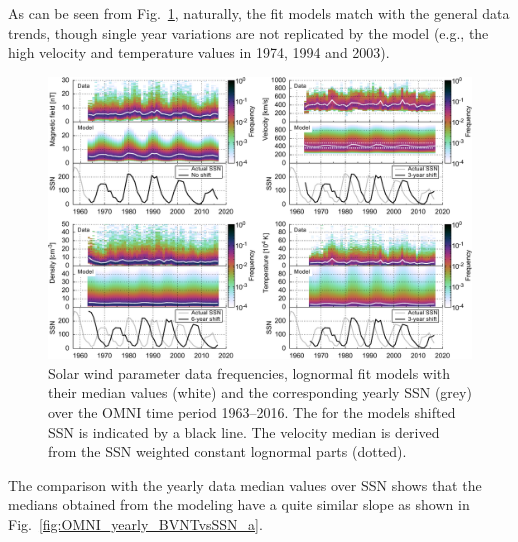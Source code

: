 As can be seen from Fig.~\ref{fig:OMNI_yearly_BVdblNTSSN_fit_e_plot}, naturally, the fit models match with the general data trends, though single year variations are not replicated by the model (e.g., the high velocity and temperature values in 1974, 1994 and 2003).
\begin{figure}
	\includegraphics[width=18cm]{figures/OMNI_yearly_BVdblNTSSN_fit_e_plot.pdf}
	\caption{Solar wind parameter data frequencies, lognormal fit models with their median values (white) and the corresponding yearly SSN (grey) over the OMNI time period 1963--2016. The for the models shifted SSN is indicated by a black line. The velocity median is derived from the SSN weighted constant lognormal parts (dotted).}
	\label{fig:OMNI_yearly_BVdblNTSSN_fit_e_plot}
\end{figure}
The comparison with the yearly data median values over SSN shows that the medians obtained from the modeling have a quite similar slope as shown in Fig.~\ref{fig:OMNI_yearly_BVNTvsSSN_a}.

